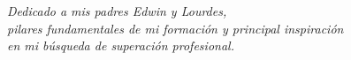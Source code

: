\chapter*{}
\begin{flushright}
\textit{Dedicado a mis padres Edwin y Lourdes, \\
pilares fundamentales de mi formación y principal inspiración \\
en mi búsqueda de superación profesional.}
\end{flushright}
